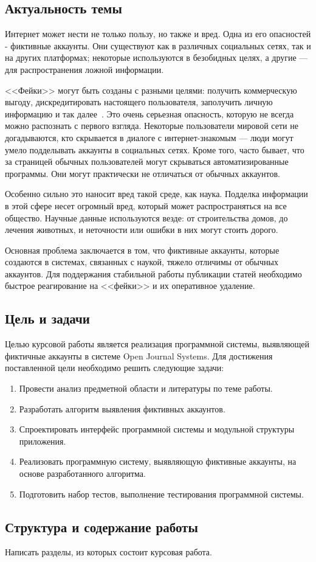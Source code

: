 \newpage
{}

\subsection*{Актуальность темы}
Интернет может нести не только пользу, но также и вред. Одна из его опасностей - фиктивные аккаунты. Они существуют как в различных социальных сетях, так и на других платформах; некоторые используются в безобидных целях, а другие — для распространения ложной информации.

<<Фейки>> могут быть созданы с разными целями: получить коммерческую выгоду, дискредитировать настоящего пользователя, заполучить личную информацию и так далее~\cite{HassanAA23}. Это очень серьезная опасность, которую не всегда можно распознать с первого взгляда. Некоторые пользователи мировой сети не догадываются, кто скрывается в диалоге с интернет-знакомым — люди могут умело подделывать аккаунты в социальных сетях. Кроме того, часто бывает, что за страницей обычных пользователей могут скрываться автоматизированные программы. Они могут практически не отличаться от обычных аккаунтов.

Особенно сильно это наносит вред такой среде, как наука. Подделка информации в этой сфере несет огромный вред, который может распространяться на все общество. Научные данные используются везде: от строительства домов, до лечения животных, и неточности или ошибки в них могут стоить дорого. 

Основная проблема заключается в том, что фиктивные аккаунты, которые создаются в системах, связанных с наукой, тяжело отличимы от обычных аккаунтов. Для поддержания стабильной работы публикации статей необходимо быстрое реагирование на <<фейки>> и их оперативное удаление. 

\subsection*{Цель и задачи}
Целью курсовой работы является реализация программной системы, выявляющей фиктичные аккаунты в системе Open Journal Systems. Для достижения поставленной цели необходимо решить следующие задачи:
\begin{enumerate}
	\item Провести анализ предметной области и литературы по теме работы.
	\item Разработать алгоритм выявления фиктивных аккаунтов.
	\item Спроектировать интерфейс программной системы и модульной структуры приложения.
	\item Реализовать программную систему, выявляющую фиктивные аккаунты, на основе разработанного алгоритма.
        \item Подготовить набор тестов, выполнение тестирования программной системы.
\end{enumerate}

\subsection*{Структура и содержание работы}
Написать разделы, из которых состоит курсовая работа.